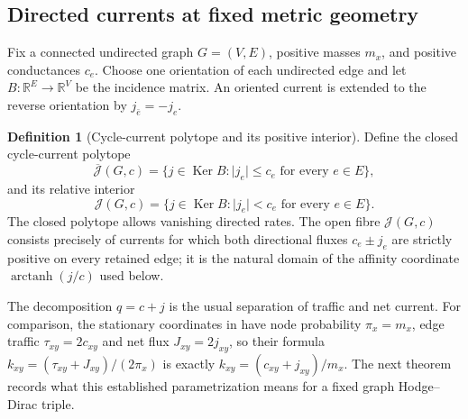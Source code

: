 \documentclass[11pt]{article}
\theoremstyle{definition}
\newtheorem{definition}[definition]{Definition}
\theoremstyle{remark}
\theoremstyle{definition}
\theoremstyle{remark}
\newcommand{\R}{\mathbb R}
\newcommand{\Ker}{\operatorname{Ker}}
\newcommand{\abs}[1]{\lvert#1\rvert}
\begin{document}
\subsection{Directed currents at fixed metric geometry}

Fix a connected undirected graph $G=(V,E)$, positive masses $m_x$, and positive
conductances $c_e$.  Choose one orientation of each undirected edge and let
$B:\R^E\to\R^V$ be the incidence matrix.  An oriented current is extended to
the reverse orientation by $j_{\bar e}=-j_e$.

\begin{definition}[Cycle-current polytope and its positive interior]
\label{def:supp-current-polytope}
Define the closed cycle-current polytope
\begin{equation}
 \overline{\mathcal J}(G,c)
 =\{j\in\Ker B:\abs{j_e}\le c_e\text{ for every }e\in E\},
 \label{eq:supp-current-polytope-closed}
\end{equation}
and its relative interior
\begin{equation}
 \mathcal J(G,c)
 =\{j\in\Ker B:\abs{j_e}<c_e\text{ for every }e\in E\}.
 \label{eq:supp-current-polytope}
\end{equation}
The closed polytope allows vanishing directed rates.  The open fibre
$\mathcal J(G,c)$ consists precisely of currents for which both directional fluxes
$c_e\pm j_e$ are strictly positive on every retained edge; it is the natural domain
of the affinity coordinate $\operatorname{arctanh}(j/c)$ used below.
\end{definition}

The decomposition $q=c+j$ is the usual separation of traffic and net current.
For comparison, the stationary coordinates in \cite{YangDill2026} have node
probability $\pi_x=m_x$, edge traffic $\tau_{xy}=2c_{xy}$ and net flux
$J_{xy}=2j_{xy}$, so their formula
$k_{xy}=(\tau_{xy}+J_{xy})/(2\pi_x)$ is exactly
$k_{xy}=(c_{xy}+j_{xy})/m_x$.  The next theorem records what this established
parametrization means for a fixed graph Hodge--Dirac triple.
\end{document}
